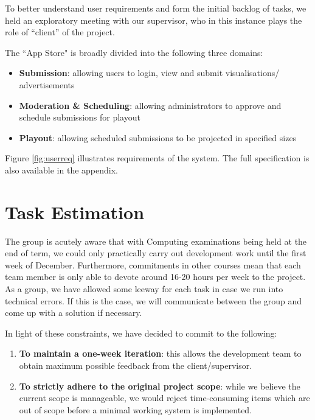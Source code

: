 \documentclass[a4paper]{article}
\begin{document}
To better understand user requirements and form the initial backlog of tasks, we held an exploratory meeting with our supervisor, who in this instance plays the role of ``client'' of the 
project.

The ``App Store" is broadly divided into the following three domains:
\begin{itemize}
  \item \textbf{Submission}: allowing users to login, view and submit 
        visualisations/ advertisements
  \item \textbf{Moderation \& Scheduling}: allowing administrators to approve
        and schedule submissions for playout
  \item \textbf{Playout}: allowing scheduled submissions to be projected in
        specified sizes

\end{itemize}



Figure \ref{fig:userreq} illustrates requirements of the system.
The full specification is also available in the appendix.

\section{Task Estimation}
The group is acutely aware that with Computing examinations being held at the
end of term, we could only practically carry out development work until the
first week of December. Furthermore, commitments in other courses mean that 
each team member is only able to devote around 16-20 hours per week to
the project. As a group, we have allowed some leeway for each task in case we run into technical errors. If this is the case, we will communicate between the group and come up with a solution if necessary.

In light of these constraints, we have decided to commit to the following:
\begin{enumerate}
  \item \textbf{To maintain a one-week iteration}: this allows the development team to
        obtain maximum possible feedback from the client/supervisor.
  \item \textbf{To strictly adhere to the original project scope}: while we believe the
        current scope is manageable, we would reject time-consuming items which
        are out of scope before a minimal working system is implemented.
\end{enumerate}
\end{document}
